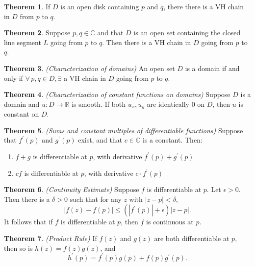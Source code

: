 \documentclass[a4paper]{article}
\theoremstyle{definition}
\newtheorem{theorem}{Theorem}
\begin{document}
	\begin{theorem}
		If $D$ is an open disk containing $p$ and $q$, there there is a VH chain in $D$ from $p$ to $q$.
	\end{theorem}
	
	\begin{theorem}
		Suppose $p, q \in \mathbb{C}$ and that $D$ is an open set containing the closed line segment $L$ going from $p$ to $q$. Then there is a VH chain in $D$ going from $p$ to $q$.
	\end{theorem}
	
	\begin{theorem}
		\emph{(Characterization of domains)}
		An open set $D$ is a domain if and only if $\forall \, p, q \in D, \exists$ a VH chain in $D$ going from $p$ to $q$.
	\end{theorem}
	
	\begin{theorem}
		\emph{(Characterization of constant functions on domains)}
		Suppose $D$ is a domain and $u : D \rightarrow \mathbb{R}$ is smooth. If both $u_{x}, u_{y}$ are identically 0 on $D$, then $u$ is constant on $D$.
	\end{theorem}
	
	\begin{theorem}
		\emph{(Sums and constant multiples of differentiable functions)}
		Suppose that $f^{\prime}(p)$ and $g^{\prime}(p)$ exist, and that $c \in \mathbb{C}$ is a constant. Then:
		\begin{enumerate}[label=\alph*.]
			\item $f + g$ is differentiable at $p$, with derivative $f^{\prime}(p) + g^{\prime}(p)$
			\item $c f$ is differentiable at $p$, with derivative $c \cdot f^{\prime}(p)$
		\end{enumerate}
	\end{theorem}
	
	\begin{theorem}
		\emph{(Continuity Estimate)}
		Suppose $f$ is differentiable at $p$. Let $\epsilon > 0$. Then there is a $\delta > 0$ such that for any $z$ with $|z - p| < \delta$,
		$$|f(z) - f(p)| \leq (|f^{\prime}(p)| + \epsilon) |z - p|.$$
		It follows that if $f$ is differentiable at $p$, then $f$ is continuous at $p$.
	\end{theorem}
	
	\begin{theorem}
		\emph{(Product Rule)}
		If $f(z)$ and $g(z)$ are both differentiable at $p$, then so is $h(z) = f(z)g(z)$, and
		$$h^{\prime}(p) = f^{\prime}(p)g(p) + f(p)g^{\prime}(p).$$
	\end{theorem}
	
\end{document}

